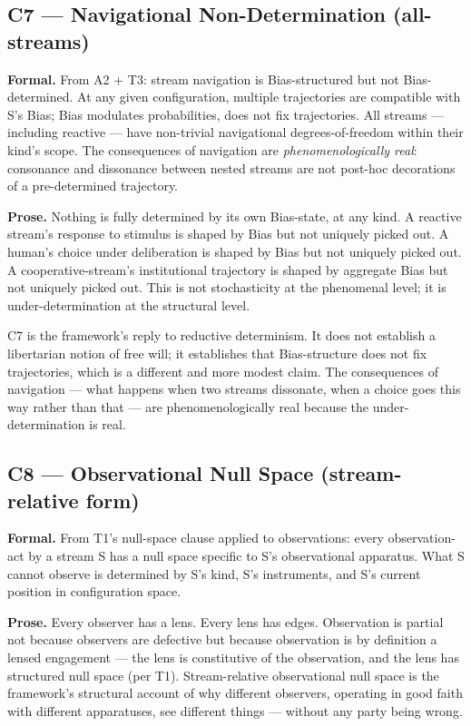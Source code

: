 \documentclass[11pt, openany]{book}
\begin{document}
\subsection{C7 --- Navigational Non-Determination (all-streams)}

\textbf{Formal.} From A2 + T3: stream navigation is Bias-structured but not Bias-determined. At any given configuration, multiple trajectories are compatible with S's Bias; Bias modulates probabilities, does not fix trajectories. All streams --- including reactive --- have non-trivial navigational degrees-of-freedom within their kind's scope. The consequences of navigation are \textit{phenomenologically real}: consonance and dissonance between nested streams are not post-hoc decorations of a pre-determined trajectory.

\textbf{Prose.} Nothing is fully determined by its own Bias-state, at any kind. A reactive stream's response to stimulus is shaped by Bias but not uniquely picked out. A human's choice under deliberation is shaped by Bias but not uniquely picked out. A cooperative-stream's institutional trajectory is shaped by aggregate Bias but not uniquely picked out. This is not stochasticity at the phenomenal level; it is under-determination at the structural level.

C7 is the framework's reply to reductive determinism. It does not establish a libertarian notion of free will; it establishes that Bias-structure does not fix trajectories, which is a different and more modest claim. The consequences of navigation --- what happens when two streams dissonate, when a choice goes this way rather than that --- are phenomenologically real because the under-determination is real.

\subsection{C8 --- Observational Null Space (stream-relative form)}

\textbf{Formal.} From T1's null-space clause applied to observations: every observation-act by a stream S has a null space specific to S's observational apparatus. What S cannot observe is determined by S's kind, S's instruments, and S's current position in configuration space.

\textbf{Prose.} Every observer has a lens. Every lens has edges. Observation is partial not because observers are defective but because observation is by definition a lensed engagement --- the lens is constitutive of the observation, and the lens has structured null space (per T1). Stream-relative observational null space is the framework's structural account of why different observers, operating in good faith with different apparatuses, see different things --- without any party being wrong.
\end{document}
